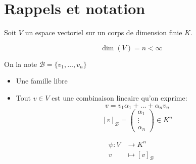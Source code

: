 \chapter{Rappels et notation}

Soit $V$ un espace vectoriel sur un corps de dimension finie $K$.

\begin{notation}
$$
\dim(V)=n<\infty
$$
\end{notation}

\begin{definition}[Base de $V$]
On la note $\mathscr{B}=\{ v_{1},\dots,v_{n} \}$
\begin{itemize}
\item Une famille libre
\item Tout $v\in V$ est une combinaison lineaire qu'on exprime:
$$
v=v_{1}\alpha_{1}+\dots+\alpha _{n}v_{n}
$$
$$
[v]_{\mathscr{B}}=\begin{pmatrix}
\alpha_{1} \\
\vdots \\
\alpha _{n} 
\end{pmatrix}\in K^{n}
$$
\end{itemize}
\end{definition}
\begin{notation}[Isomorphisme]
\begin{align*}
\psi: V & \to K^{n} \\
v & \mapsto[v]_{\mathscr{B}}
\end{align*}
\end{notation}

